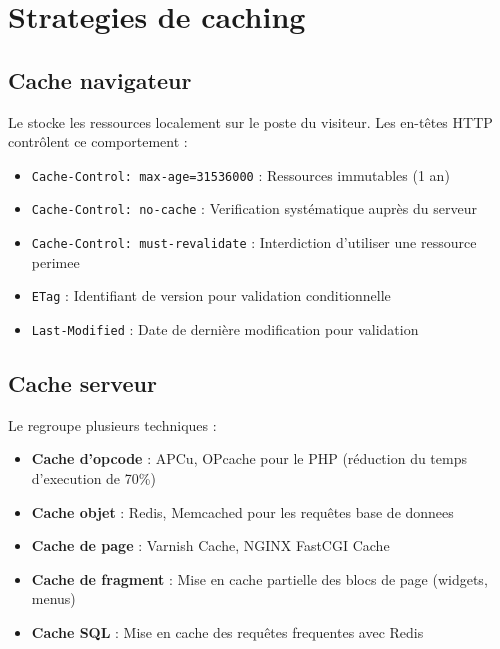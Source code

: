 \section{Strategies de caching}

\subsection{Cache navigateur}

Le  stocke les ressources localement sur le poste du visiteur. Les en-têtes HTTP contrôlent ce comportement :

\begin{itemize}
    \item \texttt{Cache-Control: max-age=31536000} : Ressources immutables (1 an)
    \item \texttt{Cache-Control: no-cache} : Verification systématique auprès du serveur
    \item \texttt{Cache-Control: must-revalidate} : Interdiction d'utiliser une ressource perimee
    \item \texttt{ETag} : Identifiant de version pour validation conditionnelle
    \item \texttt{Last-Modified} : Date de dernière modification pour validation
\end{itemize}

\subsection{Cache serveur}

Le  regroupe plusieurs techniques :

\begin{itemize}
    \item \textbf{Cache d'opcode} : APCu, OPcache pour le PHP (réduction du temps d'execution de 70\%)
    \item \textbf{Cache objet} : Redis, Memcached pour les requêtes base de donnees
    \item \textbf{Cache de page} : Varnish Cache, NGINX FastCGI Cache
    \item \textbf{Cache de fragment} : Mise en cache partielle des blocs de page (widgets, menus)
    \item \textbf{Cache SQL} : Mise en cache des requêtes frequentes avec Redis
\end{itemize}

